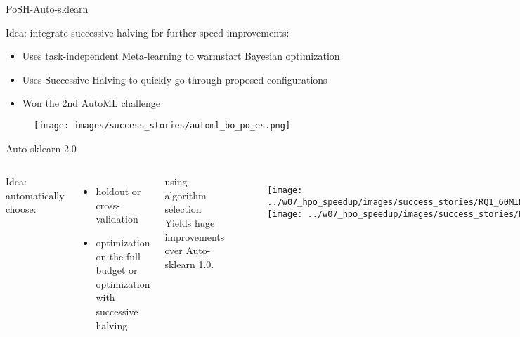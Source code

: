 
\begin{frame}[c]{PoSH-Auto-sklearn} 

Idea: integrate successive halving for further speed improvements:
\begin{itemize}
    \item Uses task-independent Meta-learning to warmstart Bayesian optimization
    \item Uses Successive Halving to quickly go through proposed configurations
    \item Won the 2nd AutoML challenge
\end{itemize}

\begin{figure}
    \centering
    \texttt{[image: images/success\_stories/automl\_bo\_po\_es.png]}
\end{figure}

\end{frame}


\begin{frame}[c]{Auto-sklearn 2.0}

\begin{columns}

\vskip 35pt
Idea: automatically choose:
\begin{itemize}
    \item holdout or cross-validation
    \item optimization on the full budget or optimization with successive halving
\end{itemize}
using algorithm selection
\vskip 10pt
Yields huge improvements over Auto-sklearn 1.0.

\begin{figure}
    \centering
    \texttt{[image: ../w07\_hpo\_speedup/images/success\_stories/RQ1\_60MIN\_ens\_rank.pdf]}
    \texttt{[image: ../w07\_hpo\_speedup/images/success\_stories/RQ1\_legend.pdf]}
    \label{fig:my_label}
\end{figure}
\end{columns}

\end{frame}

